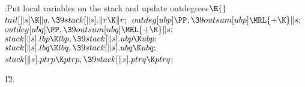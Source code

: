 \B{}:Put local variables on the stack and update outdegrees\X${}\E{}$\6
$\\{tail}[\|s]\K\|q,\39\\{stack}[\|s].\|r\K\|r;{}$\6
${}\\{outdeg}[\\{ubp}]\PP,\39\\{outsum}[\\{ubp}]\MRL{+{\K}}\|s;{}$\6
${}\\{outdeg}[\\{ubq}]\PP,\39\\{outsum}[\\{ubq}]\MRL{+{\K}}\|s;{}$\6
${}\\{stack}[\|s].\\{lbp}\K\\{lbp},\39\\{stack}[\|s].\\{ubp}\K\\{ubp};{}$\6
${}\\{stack}[\|s].\\{lbq}\K\\{lbq},\39\\{stack}[\|s].\\{ubq}\K\\{ubq};{}$\6
${}\\{stack}[\|s].\\{ptrp}\K\\{ptrp},\39\\{stack}[\|s].\\{ptrq}\K\\{ptrq}{}$;%
\par
\U12.\fi

